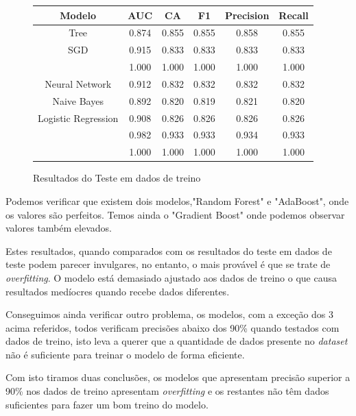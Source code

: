 \begin{figure}[H]
\begin{center}
    \setlength{\arrayrulewidth}{0.5mm}
    \renewcommand{\arraystretch}{1.5}
    \begin{tabular}{|c|c|c|c|c|c|}
        \hline
        \textbf{Modelo} & \textbf{AUC} & \textbf{CA} & \textbf{F1} & \textbf{Precision} & \textbf{Recall} \\
        \hline
         Tree  &  0.874 & 0.855 & 0.855 & 0.858 & 0.855 \\
         \hline
         SGD & 0.915 & 0.833 & 0.833 & 0.833 & 0.833 \\
         \hline
         \color{red}{Random Forest} & 1.000 & 1.000 & 1.000 & 1.000 & 1.000 \\ 
         \hline
         Neural Network & 0.912 & 0.832 & 0.832 & 0.832 & 0.832 \\
         \hline
         Naive Bayes & 0.892 & 0.820 & 0.819 & 0.821 & 0.820 \\ 
         \hline
         Logistic Regression & 0.908 & 0.826 & 0.826 & 0.826 & 0.826 \\ 
         \hline
         \color{blue}{Gradient Boosting} & 0.982 & 0.933 & 0.933 & 0.934 & 0.933 \\ 
         \hline
         \color{red}{AdaBoost} & 1.000 & 1.000 & 1.000 & 1.000 & 1.000  \\
         \hline
         
    \end{tabular}
\end{center}
 \caption{Resultados do Teste em dados de treino}
\end{figure}


Podemos verificar que existem dois modelos,"Random Forest" e "AdaBoost", onde os valores são perfeitos. Temos ainda o "Gradient Boost" onde podemos observar valores também elevados.

Estes resultados, quando comparados com os resultados do teste em dados de teste podem parecer invulgares, no entanto, o mais provável é que se trate de \textit{overfitting}. O modelo está demasiado ajustado aos dados de treino o que causa resultados medíocres quando recebe dados diferentes.

Conseguimos ainda verificar outro problema, os modelos, com a exceção dos 3 acima referidos, todos verificam precisões abaixo dos 90\% quando testados com dados de treino, isto leva a querer que a quantidade de dados presente no \textit{dataset} não é suficiente para treinar o modelo de forma eficiente.

Com isto tiramos duas conclusões, os modelos que apresentam precisão superior a 90\% nos dados de treino apresentam \textit{overfitting} e os restantes não têm dados suficientes para fazer um bom treino do modelo.






